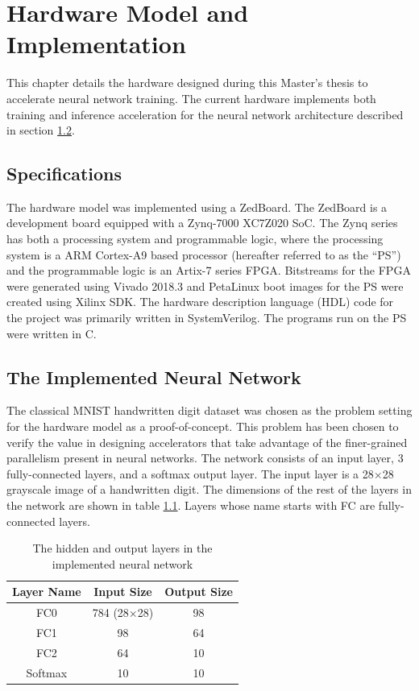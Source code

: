 \chapter{Hardware Model and Implementation}\label{hw-model}

This chapter details the hardware designed during this Master's thesis to accelerate neural network training. The current hardware implements both training and inference acceleration for the neural network architecture described in section \ref{net-arch}.
\section{Specifications}
The hardware model was implemented using a ZedBoard. The ZedBoard is a development board equipped with a Zynq-7000 XC7Z020 SoC. The Zynq series has both a processing system and programmable logic, where the processing system is a ARM Cortex-A9 based processor (hereafter referred to as the ``PS'') and the programmable logic is an Artix-7 series FPGA. Bitstreams for the FPGA were generated using Vivado 2018.3 and PetaLinux boot images for the PS were created using Xilinx SDK. The hardware description language (HDL) code for the project was primarily written in SystemVerilog. The programs run on the PS were written in C.

\section{The Implemented Neural Network}\label{net-arch}
The classical MNIST handwritten digit dataset was chosen as the problem setting for the hardware model as a proof-of-concept. This problem has been chosen to verify the value in designing accelerators that take advantage of the finer-grained parallelism present in neural networks. The network consists of an input layer, 3 fully-connected layers, and a softmax output layer. The input layer is a 28$\times$28 grayscale image of a handwritten digit. The dimensions of the rest of the layers in the network are shown in table \ref{net-arch-table}. Layers whose name starts with FC are fully-connected layers.
 
\begin{table}
	\centering
	\begin{tabular}{|c| c| c|}
		\hline
		\textbf{Layer Name}	& \textbf{Input Size} & \textbf{Output Size}\\\hline
		FC0	& 784 (28$\times$28) & 98 \\\hline
		FC1 & 98 & 64 \\\hline
		FC2 & 64 & 10 \\\hline
		Softmax & 10 & 10\\\hline
	\end{tabular}
	\caption{The hidden and output layers in the implemented neural network}
	\label{net-arch-table}
\end{table}

